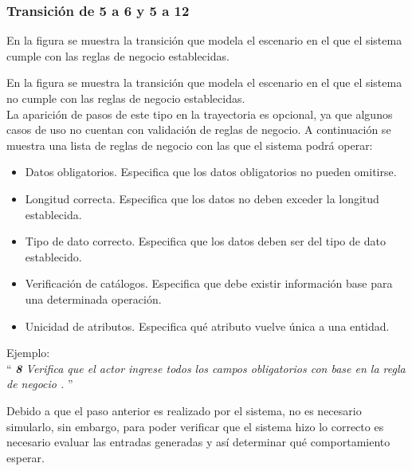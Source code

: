 \clearpage	
\subsubsection{Transición de 5 a 6 y 5 a 12}
 
 En la figura  se muestra la transición que modela el escenario en el que el sistema cumple con las reglas de negocio establecidas.
  
 
 En la figura  se muestra la transición que modela el escenario en el que el sistema no cumple con las reglas de negocio establecidas.\\
  
  
 La aparición de pasos de este tipo en la trayectoria es opcional, ya que algunos casos de uso no cuentan con validación de reglas de negocio. A continuación se muestra una lista de reglas de negocio con las que el sistema podrá operar:
 
 \begin{itemize}
	 \item Datos obligatorios. Especifica que los datos obligatorios no pueden omitirse.
	 \item Longitud correcta. Especifica que los datos no deben exceder la longitud establecida.
	 \item Tipo de dato correcto. Especifica que los datos deben ser del tipo de dato establecido.
	 \item Verificación de catálogos. Especifica que debe existir información base para una determinada operación.
	 \item Unicidad de atributos. Especifica qué atributo vuelve única a una entidad.\\
 \end{itemize}
 

Ejemplo:\\

 ``{\it
    {\bf 8} \UCsist Verifica que el actor ingrese todos los campos obligatorios con base en la regla de negocio  . 
 }''
	
	Debido a que el paso anterior es realizado por el sistema, no es necesario simularlo, sin embargo, para poder verificar que el sistema hizo lo correcto es necesario evaluar las entradas generadas y así determinar qué comportamiento esperar.
	
